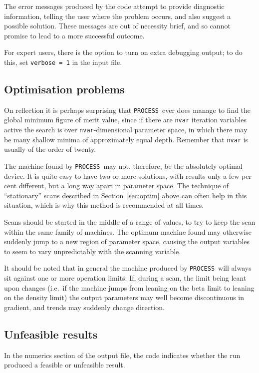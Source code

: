 \documentclass[11pt,a4paper]{report}
\newcommand{\process}{\mbox{\texttt{PROCESS}}}
\begin{document}
The error messages produced by the code attempt to provide diagnostic
information, telling the user where the problem occurs, and also suggest a
possible solution. These messages are out of necessity brief, and so cannot
promise to lead to a more successful outcome.

For expert users, there is the option to turn on extra debugging output; to do
this, set \texttt{verbose = 1} in the input file.

\subsection{Optimisation problems}

On reflection it is perhaps surprising that \process\ ever does manage to
find the global minimum figure of merit value, since if there are
\texttt{nvar} iteration variables active the search is over
\texttt{nvar}-dimensional parameter space, in which there may be many shallow
minima of approximately equal depth. Remember that \texttt{nvar} is usually of
the order of twenty.

The machine found by \process\ may not, therefore, be the absolutely optimal
device. It is quite easy to have two or more solutions, with results only a
few per cent different, but a long way apart in parameter space. The technique
of ``stationary'' scans described in Section~\ref{sec:optim} above can often
help in this situation, which is why this method is recommended at all times.

Scans should be started in the middle of a range of values, to try to keep the
scan within the same family of machines. The optimum machine found may
otherwise suddenly jump to a new region of parameter space, causing the output
variables to seem to vary unpredictably with the scanning variable.

It should be noted that in general the machine produced by \process\ will
always sit against one or more operation limits. If, during a scan, the limit
being leant upon changes (i.e.\ if the machine jumps from leaning on the beta
limit to leaning on the density limit) the output parameters may well become
discontinuous in gradient, and trends may suddenly change direction.

\subsection{Unfeasible results}

In the numerics section of the output file, the code indicates whether the run
produced a feasible or unfeasible result.
\end{document}
